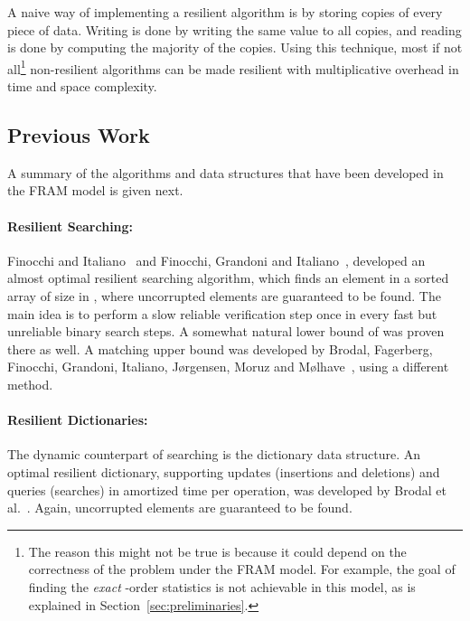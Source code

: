 \documentclass{llncs}
\begin{document}
A naive way of implementing a resilient algorithm is by storing  copies of every piece of data. Writing is done by writing the same value to all copies, and reading is done by computing the majority of the copies. Using this technique, most if not all\footnote{The reason this might not be true is because it could depend on the correctness of the problem under the FRAM model. For example, the goal of finding the \emph{exact} -order statistics is not achievable  in this model, as is explained in Section~\ref{sec:preliminaries}.} non-resilient algorithms can be made resilient with  multiplicative overhead in time and space complexity.



\subsection{Previous Work}

A summary of the algorithms and data structures that have been developed in the FRAM model is given next.

\paragraph{Resilient Searching:} 
		
		Finocchi and Italiano~\cite{resilient_data_structures} and
		Finocchi, Grandoni and Italiano~\cite{resilient_sorting},
		developed an almost optimal resilient searching algorithm,
		which finds an element in a sorted array of size  in ,
		where uncorrupted elements are guaranteed to be found.
		The main idea is to perform a slow reliable verification step once in every 
		fast but unreliable binary search steps.    
		A somewhat natural lower bound of  was proven there as well.
		A matching upper bound was developed by
		Brodal, Fagerberg, Finocchi, Grandoni, Italiano, J{\o}rgensen, Moruz and M{\o}lhave~\cite{optimal_resilient_dictionaries},
		using a different method.

\paragraph{Resilient Dictionaries:}

	The dynamic counterpart of searching is the dictionary data structure.
	An optimal resilient dictionary,
	supporting updates (insertions and deletions) and queries (searches)
	in  amortized time per operation,
	was developed by Brodal et al.~\cite{optimal_resilient_dictionaries}.
	Again, uncorrupted elements are guaranteed to be found.
\end{document}
